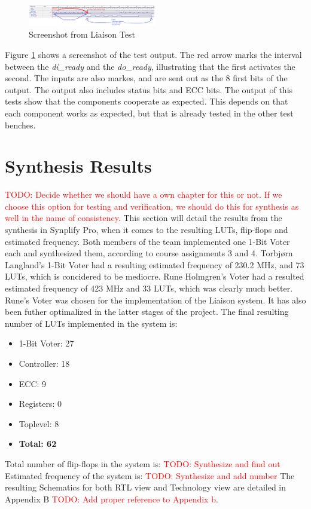 \documentclass[a4paper]{IEEEtran}
\newcommand\TODO[1]{\textcolor{red}{TODO:#1}}
\newcommand\todo[1]{\TODO{#1}}
\begin{document}
\begin{figure}[h!]
    \centering
    \includegraphics[width=0.5\textwidth]{Figures/Tests/LiaisionTest}
    \caption{Screenshot from Liaison Test}
    \label{fig:LiaisonTests}
\end{figure}

Figure \ref{fig:LiaisonTests} shows a screenshot of the test output.
The red arrow marks the interval between the \textit{di\_ready} and the \textit{do\_ready}, illustrating that the first activates the second.
The inputs are also markes, and are sent out as the 8 first bits of the output.
The output also includes status bits and ECC bits.
The output of this tests show that the components cooperate as expected.
This depends on that each component works as expected, but that is already tested in the other test benches.

\section{Synthesis Results}
\todo{ Decide whether we should have a own chapter for this or not. If we choose this option for testing and verification, we should do this for synthesis as well in the name of consistency. }
This section will detail the results from the synthesis in Synplify Pro, when it comes to the resulting LUTs, flip-flops and estimated frequency.
\break
\break
Both members of the team implemented one 1-Bit Voter each and synthesized them, according to course assignments 3 and 4.
Torbjørn Langland's 1-Bit Voter had a resulting estimated frequency of 230.2 MHz, and 73 LUTs, which is concidered to be mediocre.
Rune Holmgren's Voter had a resulted estimated frequency of 423 MHz and 33 LUTs, which was clearly much better.
Rune's Voter was chosen for the implementation of the Liaison system.
It has also been futher optimalized in the latter stages of the project.
The final resulting number of LUTs implemented in the system is:
\begin{itemize}
    \item 1-Bit Voter: 27
    \item Controller: 18
    \item ECC: 9
    \item Registers: 0
    \item Toplevel: 8
    \item \textbf{Total: 62}
\end{itemize}
Total number of flip-flops in the system is: \todo{ Synthesize and find out}
\break
Estimated frequency of the system is: \todo{ Synthesize and add number}
\break
The resulting Schematics for both RTL view and Technology view are detailed in Appendix B \todo{ Add proper reference to Appendix b}.
\end{document}
